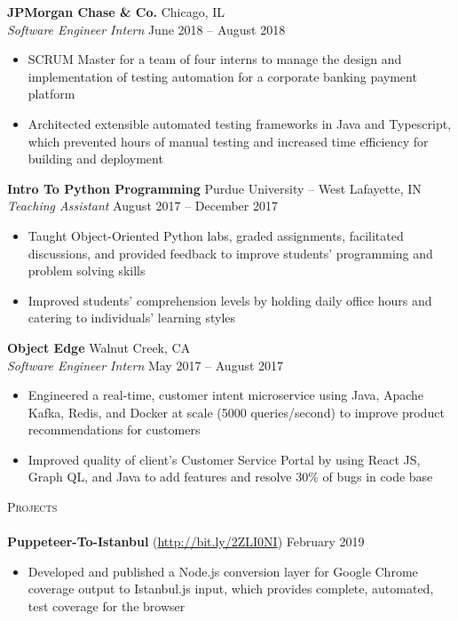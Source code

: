 \documentclass[a4paper, 10pt]{article}
\newcommand{\lineunder} {
    \vspace*{-8pt} \\
    \hspace*{-18pt} \hrulefill \\
}
\newcommand{\header} [1] {
    {
        \hspace*{-18pt}\vspace*{6pt}
        {\large\textsc{#1}}
    }
    \vspace*{-6pt} \lineunder
}
\begin{document}
\textbf{JPMorgan Chase \& Co.} \hfill Chicago, IL\\
\textit{Software Engineer Intern} \hfill June 2018 -- August 2018\\
\vspace{-1mm}
\begin{itemize} \itemsep 1pt
	\item SCRUM Master for a team of four interns to manage the design and implementation of testing automation for a corporate banking payment platform
	\item Architected extensible automated testing frameworks in Java and Typescript, which prevented hours of manual testing and increased time efficiency for building and deployment
\end{itemize}

\textbf{Intro To Python Programming} \hfill Purdue University -- West Lafayette, IN\\
\textit{Teaching Assistant} \hfill August 2017 – December 2017\\
\vspace{-1mm}
\begin{itemize} \itemsep 1pt
	\item Taught Object-Oriented Python labs, graded assignments, facilitated discussions, and provided feedback to improve students’ programming and problem solving skills
	\item Improved students’ comprehension levels by holding daily office hours and catering to individuals’ learning styles
\end{itemize}

\textbf{Object Edge} \hfill Walnut Creek, CA\\
\textit{Software Engineer Intern} \hfill May 2017 -- August 2017\\
\vspace{-1mm}
\begin{itemize} \itemsep 1pt
	\item Engineered a real-time, customer intent microservice using Java, Apache Kafka, Redis, and Docker at scale (5000 queries/second) to improve product recommendations for customers
	\item Improved quality of client’s Customer Service Portal by using React JS, Graph QL, and Java to add features and resolve 30\% of bugs in code base
\end{itemize}

\header{Projects}
{\textbf{Puppeteer-To-Istanbul}} (\href{http://bit.ly/2ZLI0NI}{http://bit.ly/2ZLI0NI}) \hfill February 2019\\
\vspace{-1mm}
\begin{itemize} \itemsep 1pt
	\item Developed and published a Node.js conversion layer for Google Chrome coverage output to Istanbul.js input, which provides complete, automated, test coverage for the browser
\end{itemize}
\vspace*{2mm}
\end{document}
